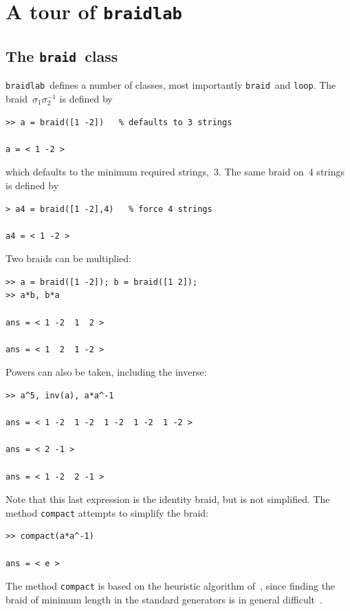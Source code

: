 \documentclass[12pt]{article}
\newcommand{\braidlab}{\texttt{braidlab}}%
\newcommand{\braid}{\texttt{braid}}%
\newcommand{\loopc}{\texttt{loop}}%
\begin{document}
\section{A tour of \braidlab}
\label{sec:tour}

\subsection{The \braid\ class}
\label{sec:braidclass}

\braidlab\ defines a number of classes, most importantly \braid\ and
\loopc.  The braid~$\sigma_1\sigma_2^{-1}$ is defined by
\begin{lstlisting}[frame=single,framerule=0pt]
>> a = braid([1 -2])   % defaults to 3 strings

a = < 1 -2 >
\end{lstlisting}
which defaults to the minimum required strings,~$3$.  The same braid
on~$4$ strings is defined by
\begin{lstlisting}[frame=single,framerule=0pt]
> a4 = braid([1 -2],4)   % force 4 strings

a4 = < 1 -2 >
\end{lstlisting}
Two braids can be multiplied:
\begin{lstlisting}[frame=single,framerule=0pt]
>> a = braid([1 -2]); b = braid([1 2]);
>> a*b, b*a

ans = < 1 -2  1  2 >

ans = < 1  2  1 -2 >
\end{lstlisting}
Powers can also be taken, including the inverse:
\begin{lstlisting}[frame=single,framerule=0pt]
>> a^5, inv(a), a*a^-1

ans = < 1 -2  1 -2  1 -2  1 -2  1 -2 >

ans = < 2 -1 >

ans = < 1 -2  2 -1 >
\end{lstlisting}
Note that this last expression is the identity braid, but is not
simplified.  The method \lstinline{compact} attempts to simplify the
braid:
\begin{lstlisting}[frame=single,framerule=0pt]
>> compact(a*a^-1)

ans = < e >
\end{lstlisting}
The method \lstinline{compact} is based on the heuristic algorithm
of~\citet{Bangert2002}, since finding the braid of minimum length in
the standard generators is in general difficult~\citep{Paterson1991}.
\end{document}
